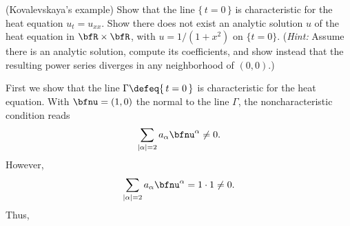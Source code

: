 \begin{problem}
  (Kovalevskaya's example) Show that the line \(\{\,t=0\,\}\) is
  characteristic for the heat equation \(u_t=u_{xx}\). Show there does not
  exist an analytic solution \(u\) of the heat equation in
  \(\bfR\times\bfR\), with \(u=1/(1+x^2)\) on \(\{t=0\}\). (\emph{Hint:}
  Assume there is an analytic solution, compute its coefficients, and show
  instead that the resulting power series diverges in any neighborhood of
  \((0,0)\).)
\end{problem}
\begin{solution}
  First we show that the line \(\Gamma\defeq\{\,t=0\,\}\) is characteristic
  for the heat equation. With \(\bfnu=(1,0)\) the normal to the line
  \(\Gamma\), the noncharacteristic condition reads
  \[
    \sum_{|\alpha|=2} a_\alpha\bfnu^\alpha\neq 0.
  \]
  However,
  \[
    \sum_{|\alpha|=2} a_\alpha\bfnu^\alpha=%
    1\cdot 1\neq%
    0.
  \]
  Thus,
\end{solution}

